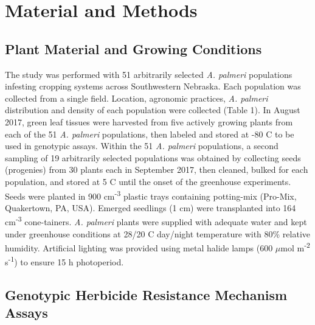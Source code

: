 \documentclass[
  12pt,
  a4paper]{article}
\begin{document}
\hypertarget{material-and-methods}{%
\section{Material and Methods}\label{material-and-methods}}

\hypertarget{plant-material-and-growing-conditions}{%
\subsection{Plant Material and Growing
Conditions}\label{plant-material-and-growing-conditions}}

The study was performed with 51 arbitrarily selected \emph{A. palmeri}
populations infesting cropping systems across Southwestern Nebraska.
Each population was collected from a single field. Location, agronomic
practices, \emph{A. palmeri} distribution and density of each population
were collected (Table 1). In August 2017, green leaf tissues were
harvested from five actively growing plants from each of the 51 \emph{A.
palmeri} populations, then labeled and stored at -80 C to be used in
genotypic assays. Within the 51 \emph{A. palmeri} populations, a second
sampling of 19 arbitrarily selected populations was obtained by
collecting seeds (progenies) from 30 plants each in September 2017, then
cleaned, bulked for each population, and stored at 5 C until the onset
of the greenhouse experiments. Seeds were planted in 900
cm\textsuperscript{-3} plastic trays containing potting-mix
(Pro-Mix\textsuperscript \textregistered, Quakertown, PA, USA). Emerged
seedlings (1 cm) were transplanted into 164 cm\textsuperscript{-3}
cone-tainers. \emph{A. palmeri} plants were supplied with adequate water
and kept under greenhouse conditions at 28/20 C day/night temperature
with 80\% relative humidity. Artificial lighting was provided using
metal halide lamps (600 \(\mu\)mol m\textsuperscript{-2}
s\textsuperscript{-1}) to ensure 15 h photoperiod.

\hypertarget{genotypic-herbicide-resistance-mechanism-assays}{%
\subsection{Genotypic Herbicide Resistance Mechanism
Assays}\label{genotypic-herbicide-resistance-mechanism-assays}}
\end{document}
